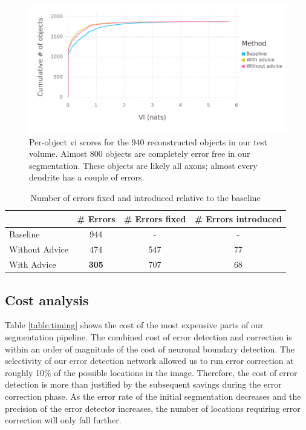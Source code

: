 \documentclass{article}
\begin{document}
\begin{figure}
\begin{center}
\includegraphics[width=0.65\linewidth]{per_object_vi.pdf}
\caption{Per-object vi scores for the 940 reconstructed objects in our test volume. Almost 800 objects are completely error free in our segmentation. These objects are likely all axons; almost every dendrite has a couple of errors.}
\label{fig:decomp_vi_scores}
\end{center}
\end{figure}

\begin{table}[h]
  \caption{Number of errors fixed and introduced relative to the baseline}
  \label{table:errors_fixed}
  \centering
  \begin{tabular}{lccc}
    \toprule
	& \# Errors & \# Errors fixed & \# Errors introduced\\
    \midrule
    Baseline & 944 & - & - \\
    Without Advice & 474 & 547 & 77\\
	With Advice & \textbf{305} & 707 & 68\\
    \bottomrule
  \end{tabular}
\end{table}


\subsection{Cost analysis}
Table \ref{table:timing} shows the cost of the most expensive parts of our segmentation pipeline. The combined cost of error detection and correction is within an order of magnitude of the cost of neuronal boundary detection. The selectivity of our error detection network allowed us to run error correction at roughly 10\% of the possible locations in the image. Therefore, the cost of error detection is more than justified by the subsequent savings during the error correction phase. As the error rate of the initial segmentation decreases and the precision of the error detector increases, the number of locations requiring error correction will only fall further.
\end{document}
